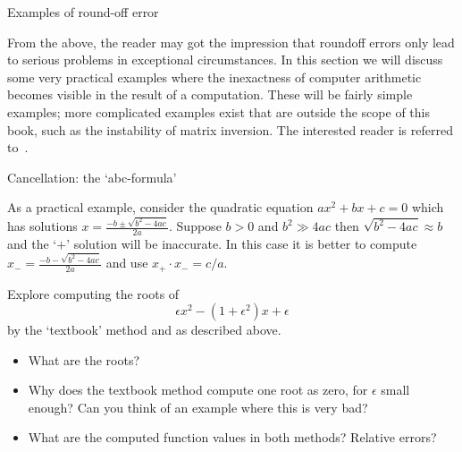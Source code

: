  {Examples of round-off error}

From the above, the reader may got the impression that roundoff errors
only lead to serious problems in exceptional circumstances. In this
section we will discuss some very practical examples where the
inexactness of computer arithmetic becomes visible in the result of a
computation. These will be fairly simple examples; more complicated
examples exist that are outside the scope of this book, such as the
instability of matrix inversion. The interested reader is referred
to~\cite{Higham:2002:ASN,Wilkinson:roundoff}.

 {Cancellation: the `abc-formula'}
\label{sec:abc-formula}

As a practical example, consider the quadratic equation $ax^2+bx+c=0$ 
which has solutions $x=\frac{-b\pm\sqrt{b^2-4ac}}{2a}$.
Suppose $b>0$ and $b^2\gg 4ac$ then $\sqrt{b^2-4ac}\approx b$ and
the `$+$' solution will be
inaccurate. In this case it is better 
to compute $x_-=\frac{-b-\sqrt{b^2-4ac}}{2a}$ and use $x_+\cdot x_-=c/a$.


\begin{exercise}
  Explore computing the roots of
  \begin{equation}
    \epsilon x^2 -(1+\epsilon^2)x + \epsilon
  \end{equation}
  by the `textbook' method and as described above.
  \begin{itemize}
  \item What are the roots?
  \item Why does the textbook method compute one root as zero,
    for $\epsilon$ small enough? Can you think of an example where this
    is very bad?
  \item What are the computed function values in both methods? Relative errors?
  \end{itemize}
\end{exercise}

